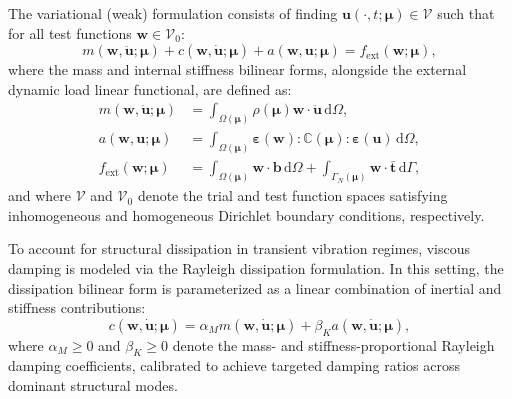 The variational (weak) formulation consists of finding $\bm{u}(\cdot, t; \bm{\mu}) \in \mathcal{V}$ such that for all test functions $\bm{w} \in \mathcal{V}_0$:
\begin{equation}
    m(\bm{w}, \ddot{\bm{u}}; \bm{\mu}) + c(\bm{w}, \dot{\bm{u}}; \bm{\mu}) + a(\bm{w}, \bm{u}; \bm{\mu}) = f_{\text{ext}}(\bm{w}; \bm{\mu}),
    \label{eq:weak_form}
\end{equation}
where the mass and internal stiffness bilinear forms, alongside the external dynamic load linear functional, are defined as:
\begin{align}
    m(\bm{w}, \ddot{\bm{u}}; \bm{\mu}) &= \int_{\Omega(\bm{\mu})} \rho(\bm{\mu}) \bm{w} \cdot \ddot{\bm{u}} \, \mathrm{d}\Omega, \label{eq:mass_form} \\
    a(\bm{w}, \bm{u}; \bm{\mu}) &= \int_{\Omega(\bm{\mu})} \bm{\varepsilon}(\bm{w}) : \mathbb{C}(\bm{\mu}) : \bm{\varepsilon}(\bm{u}) \, \mathrm{d}\Omega, \label{eq:stiff_form} \\
    f_{\text{ext}}(\bm{w}; \bm{\mu}) &= \int_{\Omega(\bm{\mu})} \bm{w} \cdot \bm{b} \, \mathrm{d}\Omega + \int_{\Gamma_N(\bm{\mu})} \bm{w} \cdot \bar{\bm{t}} \, \mathrm{d}\Gamma, \label{eq:load_form}
\end{align}
and where $\mathcal{V}$ and $\mathcal{V}_0$ denote the trial and test function spaces satisfying inhomogeneous and homogeneous Dirichlet boundary conditions, respectively.

To account for structural dissipation in transient vibration regimes, viscous damping is modeled via the Rayleigh dissipation formulation. In this setting, the dissipation bilinear form is parameterized as a linear combination of inertial and stiffness contributions:
\begin{equation}
    c(\bm{w}, \dot{\bm{u}}; \bm{\mu}) = \alpha_M m(\bm{w}, \dot{\bm{u}}; \bm{\mu}) + \beta_K a(\bm{w}, \dot{\bm{u}}; \bm{\mu}),
    \label{eq:rayleigh_damping}
\end{equation}
where $\alpha_M \ge 0$ and $\beta_K \ge 0$ denote the mass- and stiffness-proportional Rayleigh damping coefficients, calibrated to achieve targeted damping ratios across dominant structural modes.
